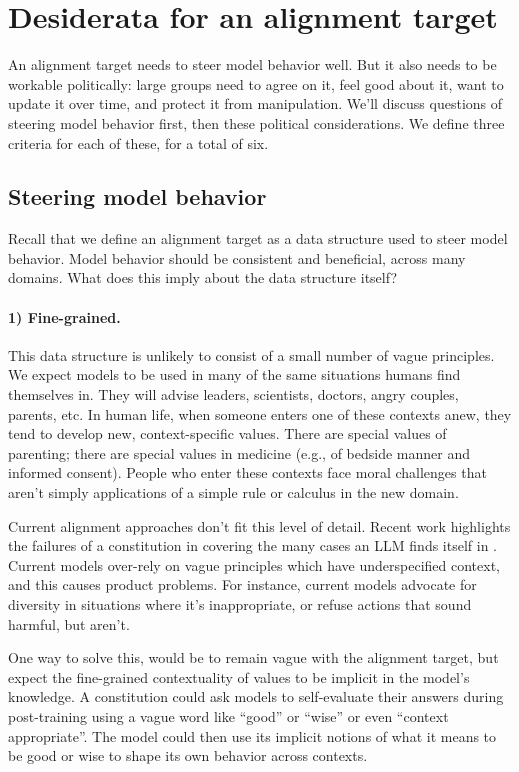 \documentclass{article}
\theoremstyle{definition}
\begin{document}
\section{Desiderata for an alignment target}\label{sec:deisderata}
An alignment target needs to steer model behavior well. But it also needs to be workable politically: large groups need to agree on it, feel good about it, want to update it over time, and protect it from manipulation. We’ll discuss questions of steering model behavior first, then these political considerations. We define three criteria for each of these, for a total of six.

\subsection{Steering model behavior}\label{sec:steeringmodelbehavior}
Recall that we define an alignment target as a data structure used to steer model behavior. Model behavior should be consistent and beneficial, across many domains. What does this imply about the data structure itself?

\paragraph{1) Fine-grained.} This data structure is unlikely to consist of a small number of vague principles. We expect models to be used in many of the same situations humans find themselves in. They will advise leaders, scientists, doctors, angry couples, parents, etc. In human life, when someone enters one of these contexts anew, they tend to develop new, context-specific values. There are special values of parenting; there are special values in medicine (e.g., of bedside manner and informed consent). People who enter these contexts face moral challenges that aren't simply applications of a simple rule or calculus in the new domain.

Current alignment approaches don’t fit this level of detail. Recent work highlights the failures of a constitution in covering the many cases an LLM finds itself in \citep{chen2023case}. Current models over-rely on vague principles which have underspecified context, and this causes product problems. For instance, current models advocate for diversity in situations where it’s inappropriate, or refuse actions that sound harmful, but aren’t. 

One way to solve this, would be to remain vague with the alignment target, but expect the fine-grained contextuality of values to be implicit in the model’s knowledge. A constitution could ask models to self-evaluate their answers during post-training using a vague word like “good” or “wise” or even “context appropriate”. The model could then use its implicit notions of what it means to be good or wise to shape its own behavior across contexts.
\end{document}
